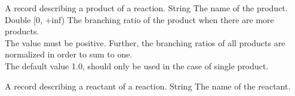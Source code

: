 \begin{RecordType}
	{}
	{} %
	{} %
	{} %
	{{{A record describing a product of a reaction.}}}
		\KeyItem
			{}
			{{String}}
			{\textrangle}
			{} %
			{{{The name of the product.}}}
		\KeyItem
			{}
			{{Double [0, +inf)}}
			{\textrangle}
			{} %
			{{{The branching ratio of the product when there are more products.}\\{
The value must be positive. Further, the branching ratios of all products are normalized in order to sum to one.}\\{
The default value 1.0, should only be used in the case of single product.}}}
\end{RecordType}
\begin{RecordType}
	{}
	{} %
	{} %
	{} %
	{{{A record describing a reactant of a reaction.}}}
		\KeyItem
			{}
			{{String}}
			{\textrangle}
			{} %
			{{{The name of the reactant.}}}
\end{RecordType}
